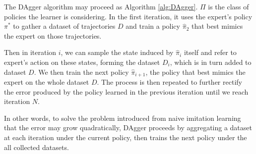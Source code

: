 \documentclass[twoside]{article}
\begin{document}
The DAgger algorithm may proceed as Algorithm \ref{alg:DAgger}.
$\Pi$ is the class of policies the learner is considering.
In the first iteration, it uses the expert’s policy $\pi^*$ to gather
a dataset of trajectories $D$ and train a policy $\hat{\pi}_2$ that best mimics the expert on those trajectories. 

Then in iteration $i$, we can sample the state induced by $\hat{\pi}_i$ itself and refer to expert's action on these states, forming the dataset $D_i$, which is in turn added to dataset $D$. We then train the next policy $\hat{\pi}_{i+1}$, the policy that best mimics the expert on the whole dataset $D$. The process is then repeated to further rectify the error produced by the policy learned in the previous iteration until we reach iteration $N$.

In other words, to solve the problem introduced from naive imitation learning that the error may grow quadratically, DAgger proceeds by aggregating a dataset at each iteration under the current policy, then trains the next policy under the all collected datasets. 








\end{document}
